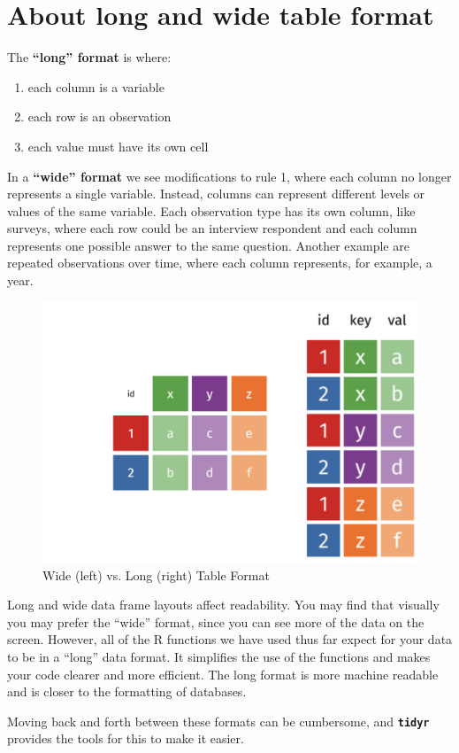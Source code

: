 \documentclass[
]{book}
\providecommand{\tightlist}{%
  \setlength{\itemsep}{0pt}\setlength{\parskip}{0pt}}
\begin{document}
\hypertarget{about-long-and-wide-table-format}{%
\section{About long and wide table format}\label{about-long-and-wide-table-format}}

The \textbf{``long'' format} is where:

\begin{enumerate}
\def\labelenumi{\arabic{enumi}.}
\tightlist
\item
  each column is a variable
\item
  each row is an observation
\item
  each value must have its own cell
\end{enumerate}

In a \textbf{``wide'' format} we see modifications to rule 1, where each column no longer represents a single variable. Instead, columns can represent different levels or values of the same variable. Each observation type has its own column, like surveys, where each row could be an interview respondent and each column represents one possible answer to the same question. Another example are repeated observations over time, where each column represents, for example, a year.

\begin{figure}
\includegraphics[width=0.3\linewidth]{img/wide-vs-long} \caption{Wide (left) vs. Long (right) Table Format}\label{fig:wide-vs-long}
\end{figure}

Long and wide data frame layouts affect readability. You may find that visually you may prefer the ``wide'' format, since you can see more of the data on the screen. However, all of the R functions we have used thus far expect for your data to be in a ``long'' data format. It simplifies the use of the functions and makes your code clearer and more efficient. The long format is more machine readable and is closer to the formatting of databases.

Moving back and forth between these formats can be cumbersome, and \textbf{\texttt{tidyr}} provides the tools for this to make it easier.
\end{document}
